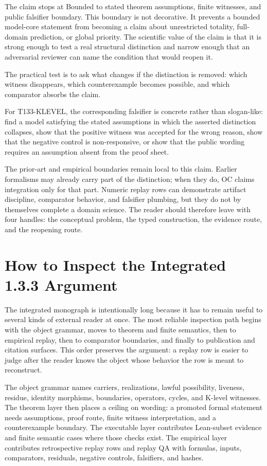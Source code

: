 The claim stops at Bounded to stated theorem assumptions, finite witnesses, and public falsifier boundary. This boundary is not decorative. It prevents a bounded model-core statement from becoming a claim about unrestricted totality, full-domain prediction, or global priority. The scientific value of the claim is that it is strong enough to test a real structural distinction and narrow enough that an adversarial reviewer can name the condition that would reopen it.

The practical test is to ask what changes if the distinction is removed: which witness disappears, which counterexample becomes possible, and which comparator absorbs the claim.

For T133-KLEVEL, the corresponding falsifier is concrete rather than slogan-like: find a model satisfying the stated assumptions in which the asserted distinction collapses, show that the positive witness was accepted for the wrong reason, show that the negative control is non-responsive, or show that the public wording requires an assumption absent from the proof sheet.

The prior-art and empirical boundaries remain local to this claim. Earlier formalisms may already carry part of the distinction; when they do, OC claims integration only for that part. Numeric replay rows can demonstrate artifact discipline, comparator behavior, and falsifier plumbing, but they do not by themselves complete a domain science. The reader should therefore leave with four handles: the conceptual problem, the typed construction, the evidence route, and the reopening route.


\section{How to Inspect the Integrated 1.3.3 Argument}
\label{sec:oc133-scientific-reading-protocol}
The integrated monograph is intentionally long because it has to remain useful to several kinds of external reader at once. The most reliable inspection path begins with the object grammar, moves to theorem and finite semantics, then to empirical replay, then to comparator boundaries, and finally to publication and citation surfaces. This order preserves the argument: a replay row is easier to judge after the reader knows the object whose behavior the row is meant to reconstruct.

The object grammar names carriers, realizations, lawful possibility, liveness, residue, identity morphisms, boundaries, operators, cycles, and K-level witnesses. The theorem layer then places a ceiling on wording: a promoted formal statement needs assumptions, proof route, finite witness interpretation, and a counterexample boundary. The executable layer contributes Lean-subset evidence and finite semantic cases where those checks exist. The empirical layer contributes retrospective replay rows and replay QA with formulas, inputs, comparators, residuals, negative controls, falsifiers, and hashes.

